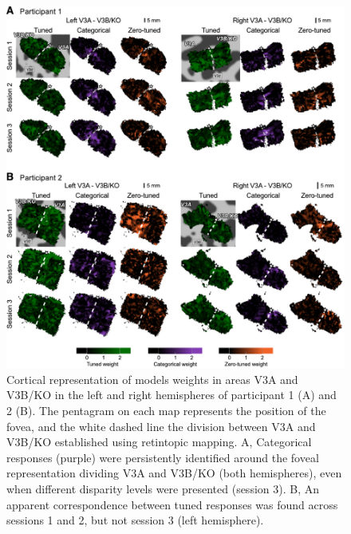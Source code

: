 \begin{figure}
  \centering
  \includegraphics[width=14cm, keepaspectratio]{fig8}
  \caption[Cortical representation of models weights for participants 1 and 2]{Cortical representation of models weights in areas V3A and V3B/KO in the left and right hemispheres of participant 1 (A) and 2 (B). The pentagram on each map represents the position of the fovea, and the white dashed line the division between V3A and V3B/KO established using retintopic mapping. A, Categorical responses (purple) were persistently identified around the foveal representation dividing V3A and V3B/KO (both hemispheres), even when different disparity levels were presented (session 3). B, An apparent correspondence between tuned responses was found across sessions 1 and 2, but not session 3 (left hemisphere).}
  \label{fig:ch4fig8}
\end{figure}

